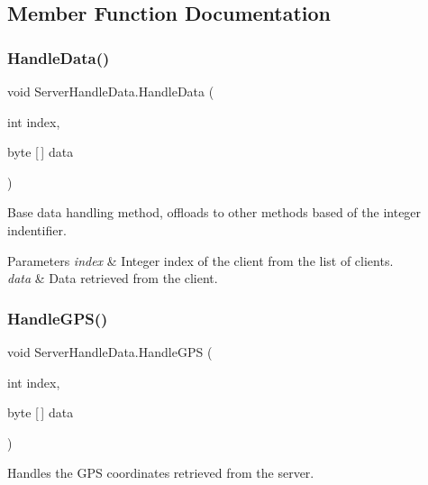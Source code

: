 \subsection{Member Function Documentation}
\mbox{\label{class_server_handle_data_adf1710050ac6dca514e7be03c9bf7d89}} 
\subsubsection{\texorpdfstring{HandleData()}{HandleData()}}
{\footnotesize\ttfamily void Server\+Handle\+Data.\+Handle\+Data (\begin{DoxyParamCaption}\item[{int}]{index,  }\item[{byte \mbox{[}$\,$\mbox{]}}]{data }\end{DoxyParamCaption})}



Base data handling method, offloads to other methods based of the integer indentifier. 


\begin{DoxyParams}{Parameters}
{\em index} & Integer index of the client from the list of clients.\\
\hline
{\em data} & Data retrieved from the client.\\
\hline
\end{DoxyParams}
\mbox{\label{class_server_handle_data_a2abdef3f8569c15c1bccae82bd04457e}} 
\subsubsection{\texorpdfstring{HandleGPS()}{HandleGPS()}}
{\footnotesize\ttfamily void Server\+Handle\+Data.\+Handle\+G\+PS (\begin{DoxyParamCaption}\item[{int}]{index,  }\item[{byte \mbox{[}$\,$\mbox{]}}]{data }\end{DoxyParamCaption})\hspace{0.3cm}{\ttfamily [private]}}



Handles the G\+PS coordinates retrieved from the server. 


